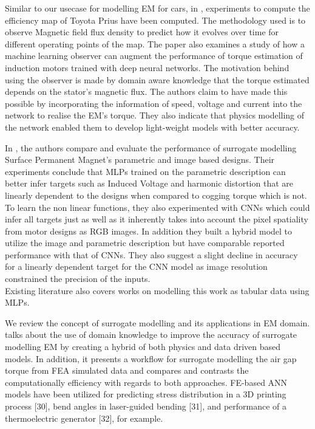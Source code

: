 \documentclass{report} %
\begin{document}
Similar to our usecase for modelling \ac{EM} for cars, in \cite{ETA-V-2020}, experiments to compute the efficiency map of Toyota Prius have 
been computed. The methodology used is to observe Magnetic field flux density to predict how it evolves over time for different operating points of the map.
The paper \cite{HMLO-2021} also examines a study of how a machine learning observer can augment the performance of torque estimation of 
induction motors trained with deep neural networks.
The motivation behind using the observer is made by domain aware knowledge that the torque estimated depends on the stator's magnetic flux.
The authors claim to have made this possible by incorporating the information of speed, voltage and current into the network to realise the \ac{EM}'s torque.
They also indicate that physics modelling of the network enabled them to develop light-weight models with better accuracy.

In \cite{EM SM-2023}, the authors compare and evaluate the performance of surrogate modelling Surface Permanent Magnet's parametric and image based designs.
Their experiments conclude that \ac{MLP}s trained on the parametric description can better infer targets such as Induced Voltage and harmonic distortion 
that are linearly dependent to the designs when compared to cogging torque which is not.
To learn the non linear functions, they also experimented with \ac{CNN}s which could infer all targets just as well as it inherently takes 
into account the pixel spatiality from motor designs as RGB images. In addition they built a hybrid model to utilize the image and parametric 
description but have comparable reported performance with that of \ac{CNN}s.
They also suggest a slight decline in accuracy for a linearly dependent target for the \ac{CNN} model as image resolution constrained the precision of the inputs.\\
Existing literature also covers works on modelling this work as tabular data using \ac{MLP}s. 

We review the concept of surrogate modelling and its applications in \ac{EM} domain.
\cite{SM EMT-2020} talks about the use of domain knowledge to improve the accuracy of surrogate modelling \ac{EM} by creating a hybrid of both physics and data driven based models.
In addition, it presents a workflow for surrogate modelling the air gap torque from \ac{FEA} simulated data and compares and contrasts the computationally efficiency with regards to both approaches. 
FE-based ANN models have been utilized for predicting stress distribution in a 3D printing process [30], bend angles in laser-guided bending [31], 
and performance of a thermoelectric generator [32], for example.
\end{document}
